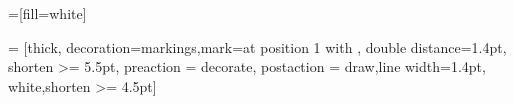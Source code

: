 \newcommand{\conjrig}{\G, \Left \Rightarrow \Right, x \colon A}
\newcommand{\conjrigh}{\G, \Left \Rightarrow \Right, x  \colon B}
\newcommand{\conjlef}{\G, \Left, x  \colon  A, x \colon B \Rightarrow \Right}

\newcommand{\ids}{id}
\newcommand{\idg}{id_{g}}
\newcommand{\refl}{refl}
\newcommand{\trans}{trans}
\newcommand{\cut}{cut}
\newcommand{\fone}{F1}
\newcommand{\ftwo}{F2}
\newcommand{\sbot}{\bot_{L}}
\newcommand{\Stop}{\top_{R}}
\newcommand{\svlef}{\wedge_{L}}
\newcommand{\svrig}{\wedge_{R}}
\newcommand{\solef}{\vlor_{L}}
\newcommand{\sorig}{\vlor_{R}}
\newcommand{\sorone}{\vlor_{R1}}
\newcommand{\sotwo}{\vlor_{R2}}
\newcommand{\sir}{\vljm_{R}}
\newcommand{\sil}{\vljm_{L}}
\newcommand{\sdl}{\Diamond_{L}}
\newcommand{\sdr}{\Diamond_{R}}
\newcommand{\sbl}{\square_{L}}
\newcommand{\sbr}{\square_{R}}
\newcommand{\smon}{mon_{L}}


\newcommand{\tup}[1]{\langle #1 \rangle}
\newcommand{\ttup}[1]{\langle\!\langle \mathrm{#1} \rangle\!\rangle}
\newcommand{\cset}[1]{\{ #1 \}}


\newcommand{\raul}[1]{\todo[inline,color=yellow!55]{{\bf Raul:} #1}}

\newcommand{\male}[1]{\todo[inline,color=green!20]{{\bf Male:} #1}}

	
	=[fill=white]
	
	 = [thick, decoration={markings,mark=at position
		1 with {}},
	double distance=1.4pt, shorten >= 5.5pt,
	preaction = {decorate},
	postaction = {draw,line width=1.4pt, white,shorten >= 4.5pt}]
	

